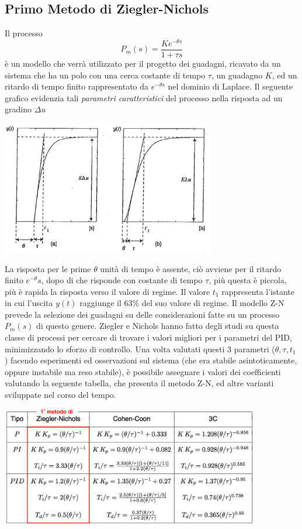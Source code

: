 \documentclass[10pt, letterpaper]{report}
\begin{document}
\subsection{Primo Metodo di Ziegler-Nichols}
Il processo 
$$ P_m(s)=\frac{Ke^{-\theta s}}{1+\tau s}$$
è un modello che verrà utilizzato per il progetto dei guadagni, ricavato da un sistema che ha un polo con una cerca costante di tempo $\tau$, un guadagno $K$, ed un ritardo di tempo finito rappresentato da $e^{-\theta s}$ nel dominio di Laplace. Il seguente grafico evidenzia tali \textit{parametri caratteristici} del processo nella risposta ad un gradino 
$\Delta u$
\begin{center}
    \includegraphics[width=0.7\textwidth]{images/tuning1.png}
\end{center}
La risposta per le prime $\theta $ unità di tempo è assente, ciò avviene per il ritardo finito $e^{-\theta}s$, dopo di che risponde con costante di tempo $\tau$, più questa è piccola, più è rapida la risposta verso il valore di regime.\acc 
Il valore $t_1$ rappresenta l'istante in cui l'uscita $y(t)$ raggiunge il $63\%$ del suo valore di regime.\acc 
Il modello Z-N prevede la selezione dei guadagni su delle considerazioni fatte su un processo $P_m(s)$ di questo genere.  Ziegler e Nichols hanno fatto degli studi su questa classe di processi per cercare di trovare i valori migliori per i parametri del PID, minimizzando lo sforzo di controllo.\acc 
Una volta valutati questi 3 parametri ($\theta,\tau,t_1$) facendo esperimenti ed osservazioni sul sistema (che era stabile asintoticamente, oppure instabile ma reso stabile), è possibile assegnare i valori dei coefficienti valutando la seguente tabella, che presenta il metodo Z-N, ed altre varianti sviluppate nel corso del tempo.\begin{center}
    \includegraphics[width=0.85\textwidth]{images/ZN.png}
\end{center}
\end{document}
